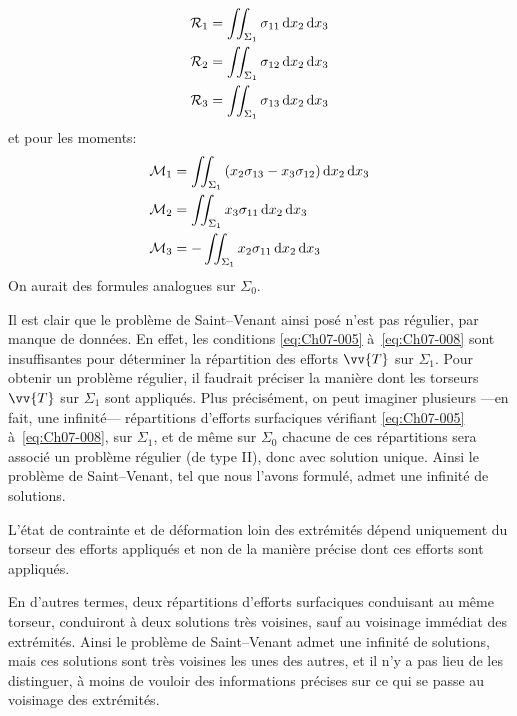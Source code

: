\begin{subequations}
\begin{align}
    \mathcal{R}_1 &= \iint_{\Sigma_1} \sigma_{11} \mathop{\mathrm{{}d}}\mathopen{} x_2 \mathop{\mathrm{{}d}}\mathopen{} x_3    \label{eq:Ch07-005} \\
        \mathcal{R}_2 &= \iint_{\Sigma_1} \sigma_{12} \mathop{\mathrm{{}d}}\mathopen{} x_2 \mathop{\mathrm{{}d}}\mathopen{} x_3 \label{eq:Ch07-005b} \\
        \mathcal{R}_3 &= \iint_{\Sigma_1} \sigma_{13} \mathop{\mathrm{{}d}}\mathopen{} x_2 \mathop{\mathrm{{}d}}\mathopen{} x_3  \label{eq:Ch07-006}
\end{align}
\end{subequations}
et pour les moments:
\begin{subequations}
\begin{align}
    \mathcal{M}_1 &= \iint_{\Sigma_1} \left( x_2\sigma_{13} - x_3\sigma_{12} \right) \mathop{\mathrm{{}d}}\mathopen{} x_2 \mathop{\mathrm{{}d}}\mathopen{} x_3 \label{eq:Ch07-007}\\
        \mathcal{M}_2 &= \iint_{\Sigma_1} x_3\sigma_{11} \mathop{\mathrm{{}d}}\mathopen{} x_2 \mathop{\mathrm{{}d}}\mathopen{} x_3 \label{eq:Ch07-007b}\\
        \mathcal{M}_3 &= -\iint_{\Sigma_1} x_2\sigma_{11} \mathop{\mathrm{{}d}}\mathopen{} x_2 \mathop{\mathrm{{}d}}\mathopen{} x_3 \label{eq:Ch07-008}
\end{align}
\end{subequations}
On aurait des formules analogues sur $\Sigma_0$.

Il est clair que le problème de Saint--Venant ainsi posé n'est pas régulier, par manque de données.
En effet, les conditions \eqref{eq:Ch07-005} à~\eqref{eq:Ch07-008} sont insuffisantes pour déterminer la répartition des efforts $\vv{T}$ sur $\Sigma_1$.
Pour obtenir un problème régulier, il faudrait préciser la manière dont les torseurs $\vv{T}$ sur $\Sigma_1$ sont appliqués.
Plus précisément, on peut imaginer plusieurs ---en fait, une infinité--- répartitions d'efforts surfaciques vérifiant \eqref{eq:Ch07-005} à~\eqref{eq:Ch07-008}, sur $\Sigma_1$, et de même sur $\Sigma_0$ chacune de ces répartitions sera associé un problème régulier (de type II), donc avec solution unique.
Ainsi le problème de Saint--Venant, tel que nous l'avons formulé, admet une infinité de solutions.

\begin{Principe}
    L'état de contrainte et de déformation loin des extrémités dépend uniquement du torseur des efforts appliqués et non de la manière précise dont ces efforts sont appliqués.
\end{Principe}

En d'autres termes, deux répartitions d'efforts surfaciques conduisant au même torseur, conduiront à deux solutions très voisines, sauf au voisinage immédiat des extrémités.
Ainsi le problème de Saint--Venant admet une infinité de solutions, mais ces solutions sont très voisines les unes des autres, et il n'y a pas lieu de les distinguer, à moins de vouloir des informations précises sur ce qui se passe au voisinage des extrémités.

